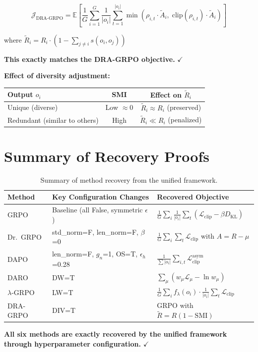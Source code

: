 \documentclass[11pt,a4paper]{article}
\begin{document}
\begin{resultbox}
\begin{equation}
\mathcal{J}_{\text{DRA-GRPO}} = \mathbb{E} \left[ \frac{1}{G} \sum_{i=1}^{G} \frac{1}{|o_i|} \sum_{t=1}^{|o_i|} \min\left( \rho_{i,t} \cdot \tilde{A}_i, \; \text{clip}(\rho_{i,t}) \cdot \tilde{A}_i \right) \right]
\end{equation}

where $\tilde{R}_i = R_i \cdot (1 - \sum_{j \neq i} s(o_i, o_j))$

\textbf{This exactly matches the DRA-GRPO objective.} $\checkmark$

\textbf{Effect of diversity adjustment:}
\begin{center}
\begin{tabular}{@{}lcc@{}}
\toprule
\textbf{Output $o_i$} & \textbf{SMI} & \textbf{Effect on $\tilde{R}_i$} \\
\midrule
Unique (diverse) & Low $\approx 0$ & $\tilde{R}_i \approx R_i$ (preserved) \\
Redundant (similar to others) & High & $\tilde{R}_i \ll R_i$ (penalized) \\
\bottomrule
\end{tabular}
\end{center}
\end{resultbox}

\newpage

\section{Summary of Recovery Proofs}

\begin{table}[H]
\centering
\begin{tabular}{@{}lll@{}}
\toprule
\textbf{Method} & \textbf{Key Configuration Changes} & \textbf{Recovered Objective} \\
\midrule
GRPO & Baseline (all False, symmetric $\epsilon$) & $\frac{1}{G}\sum_i \frac{1}{|o_i|}\sum_t (\mathcal{L}_{\text{clip}} - \beta D_{\text{KL}})$ \\[5pt]
Dr.~GRPO & std\_norm=F, len\_norm=F, $\beta$=0 & $\frac{1}{G}\sum_i \sum_t \mathcal{L}_{\text{clip}}$ with $A = R - \mu$ \\[5pt]
DAPO & len\_norm=F, $g_n$=1, OS=T, $\epsilon_h$=0.28 & $\frac{1}{\sum|o_i|}\sum_{i,t} \mathcal{L}_{\text{clip}}^{\text{asym}}$ \\[5pt]
DARO & DW=T & $\sum_\mu (w_\mu \mathcal{L}_\mu - \ln w_\mu)$ \\[5pt]
$\lambda$-GRPO & LW=T & $\frac{1}{G}\sum_i f_\lambda(o_i) \cdot \frac{1}{|o_i|}\sum_t \mathcal{L}_{\text{clip}}$ \\[5pt]
DRA-GRPO & DIV=T & GRPO with $\tilde{R} = R(1 - \text{SMI})$ \\
\bottomrule
\end{tabular}
\caption{Summary of method recovery from the unified framework.}
\end{table}

\textbf{All six methods are exactly recovered by the unified framework through hyperparameter configuration.} $\checkmark$
\end{document}
